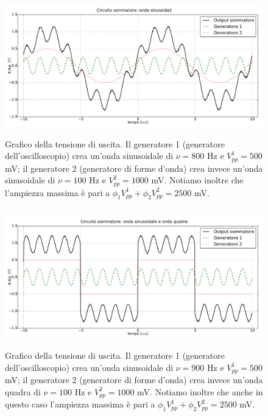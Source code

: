 \begin{figure}[ht]
 \centering
   {\includegraphics[width=16.5cm]{../E01/latex/sinsin.pdf}}
 \caption{Grafico della tensione di uscita. Il generatore 1 (generatore dell'oscilloscopio) crea un'onda sinusoidale di $\nu=800$ \si{\hertz} e $V^1_{pp}=500$ \si{\milli\volt}; il generatore 2 (generatore di forme d'onda) crea invece un'onda sinusoidale di $\nu=100$ \si{\hertz} e $V^2_{pp}=1000$ \si{\milli\volt}. Notiamo inoltre che l'ampiezza massima è pari a $\phi_1 V^1_{pp}+\phi_2 V^2_{pp}=2500$ \si{\milli\volt}.}
 \label{gr:onde1}
\end{figure}

$$$$

\begin{figure}[ht]
 \centering
   {\includegraphics[width=16.5cm]{../E01/latex/sinquad.pdf}}
 \caption{Grafico della tensione di uscita. Il generatore 1 (generatore dell'oscilloscopio) crea un'onda sinusoidale di $\nu=900$ \si{\hertz} e $V^1_{pp}=500$ \si{\milli\volt}; il generatore 2 (generatore di forme d'onda) crea invece un'onda quadra di $\nu=100$ \si{\hertz} e $V^2_{pp}=1000$ \si{\milli\volt}. Notiamo inoltre che anche in questo caso l'ampiezza massima è pari a $\phi_1 V^1_{pp}+\phi_2 V^2_{pp}=2500$ \si{\milli\volt}.}
 \label{gr:onde2}
\end{figure}

